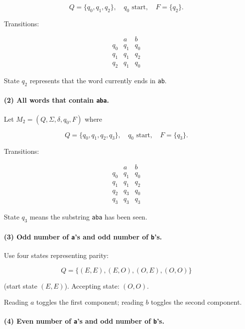 \documentclass{article}
\theoremstyle{theorem}
\theoremstyle{definition}
\theoremstyle{remark}
\begin{document}
\[
Q = \{q_0,q_1,q_2\}, \quad q_0 \text{ start}, \quad F = \{q_2\}.
\]

Transitions:

\[
\begin{array}{c|cc}
 & a & b \\
\hline
q_0 & q_1 & q_0 \\
q_1 & q_1 & q_2 \\
q_2 & q_1 & q_0
\end{array}
\]

State $q_2$ represents that the word currently ends in \texttt{ab}.

\bigskip

\paragraph{(2) All words that contain \texttt{aba}.}

Let $M_2 = (Q,\Sigma,\delta,q_0,F)$ where

\[
Q = \{q_0,q_1,q_2,q_3\}, \quad q_0 \text{ start}, \quad F = \{q_3\}.
\]

Transitions:

\[
\begin{array}{c|cc}
 & a & b \\
\hline
q_0 & q_1 & q_0 \\
q_1 & q_1 & q_2 \\
q_2 & q_3 & q_0 \\
q_3 & q_3 & q_3
\end{array}
\]

State $q_3$ means the substring \texttt{aba} has been seen.

\bigskip

\paragraph{(3) Odd number of \texttt{a}'s and odd number of \texttt{b}'s.}

Use four states representing parity:

\[
Q = \{(E,E),(E,O),(O,E),(O,O)\}
\]

(start state $(E,E)$).  
Accepting state: $(O,O)$.

Reading $a$ toggles the first component;  
reading $b$ toggles the second component.

\bigskip

\paragraph{(4) Even number of \texttt{a}'s and odd number of \texttt{b}'s.}
\end{document}
